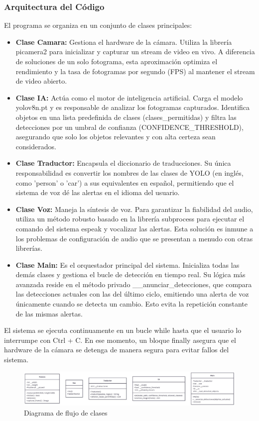 \documentclass[12pt,a4paper]{article}
\begin{document}
\subsubsection{Arquitectura del Código}
El programa se organiza en un conjunto de clases principales:
\begin{itemize}
\item \textbf{Clase Camara:} Gestiona el hardware de la cámara. Utiliza la librería picamera2 para inicializar y capturar un stream de video en vivo. A diferencia de soluciones de un solo fotograma, esta aproximación optimiza el rendimiento y la tasa de fotogramas por segundo (FPS) al mantener el stream de video abierto.
\item \textbf{Clase IA:} Actúa como el motor de inteligencia artificial. Carga el modelo yolov8n.pt y es responsable de analizar los fotogramas capturados. Identifica objetos en una lista predefinida de clases (clases\_permitidas) y filtra las detecciones por un umbral de confianza (CONFIDENCE\_THRESHOLD), asegurando que solo los objetos relevantes y con alta certeza sean considerados.
\item \textbf{Clase Traductor:} Encapsula el diccionario de traducciones. Su única responsabilidad es convertir los nombres de las clases de YOLO (en inglés, como 'person' o 'car') a sus equivalentes en español, permitiendo que el sistema de voz dé las alertas en el idioma del usuario.
\item \textbf{Clase Voz:} Maneja la síntesis de voz. Para garantizar la fiabilidad del audio, utiliza un método robusto basado en la librería subprocess para ejecutar el comando del sistema espeak y vocalizar las alertas. Esta solución es inmune a los problemas de configuración de audio que se presentan a menudo con otras librerías.
\item \textbf{Clase Main:} Es el orquestador principal del sistema. Inicializa todas las demás clases y gestiona el bucle de detección en tiempo real. Su lógica más avanzada reside en el método privado \_\_anunciar\_detecciones, que compara las detecciones actuales con las del último ciclo, emitiendo una alerta de voz únicamente cuando se detecta un cambio. Esto evita la repetición constante de las mismas alertas.
\end{itemize}
El sistema se ejecuta continuamente en un bucle while hasta que el usuario lo interrumpe con Ctrl + C. En ese momento, un bloque finally asegura que el hardware de la cámara se detenga de manera segura para evitar fallos del sistema.

\begin{figure}[H]
\noindent\hspace*{-0.7in}%
\includegraphics[width=1.2\linewidth]{Carpeta tecnica/Diagramaflujoia2.jpg}
\caption{Diagrama de flujo de clases}
\end{figure}
\end{document}
